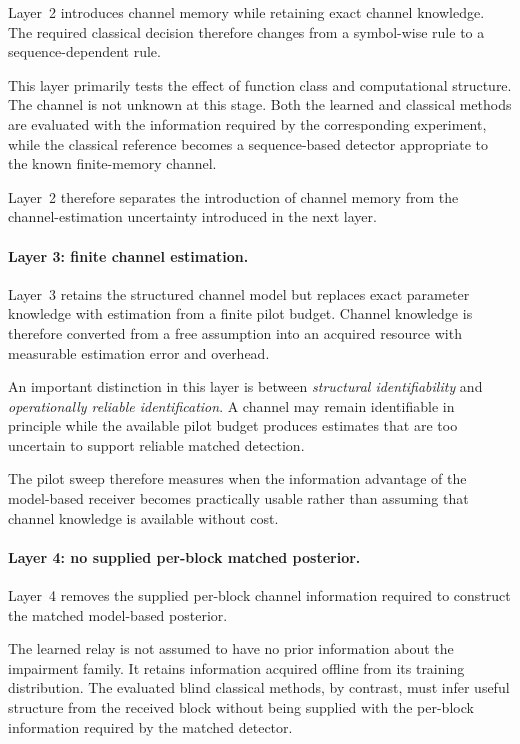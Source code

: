 Layer~2 introduces channel memory while retaining exact channel knowledge.
The required classical decision therefore changes from a symbol-wise rule to
a sequence-dependent rule.

This layer primarily tests the effect of function class and computational
structure. The channel is not unknown at this stage. Both the learned and
classical methods are evaluated with the information required by the
corresponding experiment, while the classical reference becomes a
sequence-based detector appropriate to the known finite-memory channel.

Layer~2 therefore separates the introduction of channel memory from the
channel-estimation uncertainty introduced in the next layer.


\paragraph{Layer 3: finite channel estimation.}

Layer~3 retains the structured channel model but replaces exact parameter
knowledge with estimation from a finite pilot budget. Channel knowledge is
therefore converted from a free assumption into an acquired resource with
measurable estimation error and overhead.

An important distinction in this layer is between \emph{structural
identifiability} and \emph{operationally reliable identification}. A channel
may remain identifiable in principle while the available pilot budget produces
estimates that are too uncertain to support reliable matched detection.

The pilot sweep therefore measures when the information advantage of the
model-based receiver becomes practically usable rather than assuming that
channel knowledge is available without cost.


\paragraph{Layer 4: no supplied per-block matched posterior.}

Layer~4 removes the supplied per-block channel information required to
construct the matched model-based posterior.

The learned relay is not assumed to have no prior information about the
impairment family. It retains information acquired offline from its training
distribution. The evaluated blind classical methods, by contrast, must infer
useful structure from the received block without being supplied with the
per-block information required by the matched detector.

